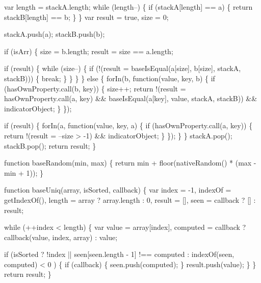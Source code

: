 \begin{DoxyCodeInclude}
{{    var length = stackA.length;
    \textcolor{keywordflow}{while} (length--) \{
      \textcolor{keywordflow}{if} (stackA[length] == a) \{
        \textcolor{keywordflow}{return} stackB[length] == b;
      \}
    \}
    var result = \textcolor{keyword}{true},
        size = 0;

    stackA.push(a);
    stackB.push(b);

    \textcolor{keywordflow}{if} (isArr) \{
      size = b.length;
      result = size == a.length;

      \textcolor{keywordflow}{if} (result) \{
        \textcolor{keywordflow}{while} (size--) \{
          \textcolor{keywordflow}{if} (!(result = baseIsEqual(a[size], b[size], stackA, stackB))) \{
            \textcolor{keywordflow}{break};
          \}
        \}
      \}
    \}
    \textcolor{keywordflow}{else} \{
      forIn(b, \textcolor{keyword}{function}(value, key, b) \{
        \textcolor{keywordflow}{if} (hasOwnProperty.call(b, key)) \{
          size++;
          \textcolor{keywordflow}{return} !(result = hasOwnProperty.call(a, key) && baseIsEqual(a[key], value, stackA, stackB)) && 
      indicatorObject;
        \}
      \});

      \textcolor{keywordflow}{if} (result) \{
        forIn(a, \textcolor{keyword}{function}(value, key, a) \{
          \textcolor{keywordflow}{if} (hasOwnProperty.call(a, key)) \{
            \textcolor{keywordflow}{return} !(result = --size > -1) && indicatorObject;
          \}
        \});
      \}
    \}
    stackA.pop();
    stackB.pop();
    \textcolor{keywordflow}{return} result;
  \}

  \textcolor{keyword}{function} baseRandom(min, max) \{
    \textcolor{keywordflow}{return} min + floor(nativeRandom() * (max - min + 1));
  \}

  \textcolor{keyword}{function} baseUniq(array, isSorted, callback) \{
    var index = -1,
        indexOf = getIndexOf(),
        length = array ? array.length : 0,
        result = [],
        seen = callback ? [] : result;

    \textcolor{keywordflow}{while} (++index < length) \{
      var value = array[index],
          computed = callback ? callback(value, index, array) : value;

      \textcolor{keywordflow}{if} (isSorted
            ? !index || seen[seen.length - 1] !== computed
            : indexOf(seen, computed) < 0
          ) \{
        \textcolor{keywordflow}{if} (callback) \{
          seen.push(computed);
        \}
        result.push(value);
      \}
    \}
    \textcolor{keywordflow}{return} result;
  \}

}}
\end{DoxyCodeInclude}

